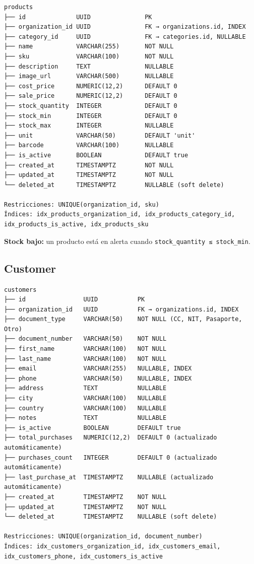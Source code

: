 \begin{verbatim}
products
├── id              UUID               PK
├── organization_id UUID               FK → organizations.id, INDEX
├── category_id     UUID               FK → categories.id, NULLABLE
├── name            VARCHAR(255)       NOT NULL
├── sku             VARCHAR(100)       NOT NULL
├── description     TEXT               NULLABLE
├── image_url       VARCHAR(500)       NULLABLE
├── cost_price      NUMERIC(12,2)      DEFAULT 0
├── sale_price      NUMERIC(12,2)      DEFAULT 0
├── stock_quantity  INTEGER            DEFAULT 0
├── stock_min       INTEGER            DEFAULT 0
├── stock_max       INTEGER            NULLABLE
├── unit            VARCHAR(50)        DEFAULT 'unit'
├── barcode         VARCHAR(100)       NULLABLE
├── is_active       BOOLEAN            DEFAULT true
├── created_at      TIMESTAMPTZ        NOT NULL
├── updated_at      TIMESTAMPTZ        NOT NULL
└── deleted_at      TIMESTAMPTZ        NULLABLE (soft delete)

Restricciones: UNIQUE(organization_id, sku)
Índices: idx_products_organization_id, idx_products_category_id, idx_products_is_active, idx_products_sku
\end{verbatim}

\textbf{Stock bajo:} un producto está en alerta cuando \texttt{stock\_quantity\ ≤\ stock\_min}.

\subsection{Customer}\label{customer}

\begin{verbatim}
customers
├── id                UUID           PK
├── organization_id   UUID           FK → organizations.id, INDEX
├── document_type     VARCHAR(50)    NOT NULL (CC, NIT, Pasaporte, Otro)
├── document_number   VARCHAR(50)    NOT NULL
├── first_name        VARCHAR(100)   NOT NULL
├── last_name         VARCHAR(100)   NOT NULL
├── email             VARCHAR(255)   NULLABLE, INDEX
├── phone             VARCHAR(50)    NULLABLE, INDEX
├── address           TEXT           NULLABLE
├── city              VARCHAR(100)   NULLABLE
├── country           VARCHAR(100)   NULLABLE
├── notes             TEXT           NULLABLE
├── is_active         BOOLEAN        DEFAULT true
├── total_purchases   NUMERIC(12,2)  DEFAULT 0 (actualizado automáticamente)
├── purchases_count   INTEGER        DEFAULT 0 (actualizado automáticamente)
├── last_purchase_at  TIMESTAMPTZ    NULLABLE (actualizado automáticamente)
├── created_at        TIMESTAMPTZ    NOT NULL
├── updated_at        TIMESTAMPTZ    NOT NULL
└── deleted_at        TIMESTAMPTZ    NULLABLE (soft delete)

Restricciones: UNIQUE(organization_id, document_number)
Índices: idx_customers_organization_id, idx_customers_email, idx_customers_phone, idx_customers_is_active
\end{verbatim}

